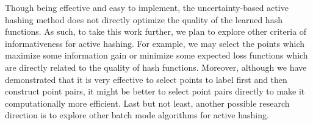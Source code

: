 Though being effective and easy to implement, the uncertainty-based active hashing method does not directly optimize the quality of the learned hash functions. As such, to take this work further, we plan to explore other criteria of informativeness for active hashing. For example, we may select the points which maximize some information gain or minimize some expected loss functions which are directly related to the quality of hash functions. Moreover, although we have demonstrated that it is very effective to select points to label first and then construct point pairs, it might be better to select point pairs directly to make it computationally more efficient. Last but not least, another possible research direction is to explore other batch mode algorithms for active hashing.

